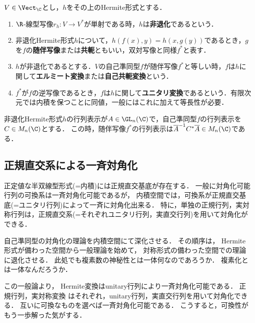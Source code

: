 \documentclass[uplatex, dvipdfmx]{jsreport}
\begin{document}
\begin{definition}
    $V\in\Vect_\C$とし，$h$をその上のHermite形式とする．
    \begin{enumerate}
        \item $\R$-線型写像$r_h:V\to V^*$が単射である時，$h$は\textbf{非退化}であるという．
        \item 非退化Hermite形式$h$について，$h(f(x),y)=h(x,g(y))$であるとき，$g$を$f$の\textbf{随伴写像}または\textbf{共軛}ともいい，双対写像と同様$f^*$と表す．
        \item $h$が非退化であるとする．$V$の自己準同型$f$が随伴写像$f^*$と等しい時，$f$は$h$に関して\textbf{エルミート変換}または\textbf{自己共軛変換}という．
        \item $f^*$が$f$の逆写像であるとき，$f$は$h$に関して\textbf{ユニタリ変換}であるという．有限次元では内積を保つことに同値，一般にはこれに加えて等長性が必要．
    \end{enumerate}
\end{definition}
\begin{remarks}[随伴写像の行列表示]
    非退化Hermite形式$h$の行列表示が$A\in\GL_n(\C)$で，自己準同型$f$の行列表示を$C\in M_n(\C)$とする．
    この時，随伴写像$f^*$の行列表示は$\overline{A}^{-1}C^*\overline{A}\in M_n(\C)$である．
\end{remarks}

\subsection{正規直交系による一斉対角化}\label{subsec-可換性と対角化}

\begin{tcolorbox}[colframe=ForestGreen, colback=ForestGreen!10!white,breakable,colbacktitle=ForestGreen!40!white,coltitle=black,fonttitle=\bfseries\sffamily,
title=]
    正定値な半双線型形式(=内積)には正規直交基底が存在する．
    一般に対角化可能行列の可換系は一斉対角化可能であるが，
    内積空間では，可換系が正規直交基底(=ユニタリ行列)によって一斉に対角化出来る．
    特に，単独の正規行列，実対称行列は，正規直交系(=それぞれユニタリ行列，実直交行列)を用いて対角化ができる．
\end{tcolorbox}

\begin{tcolorbox}[colframe=ForestGreen, colback=ForestGreen!10!white, breakable]
    自己準同型の対角化の理論を内積空間にて深化させる．
    その順序は，
    Hermite形式が備わった空間から一般理論を始めて，
    対称形式の備わった空間での理論に退化させる．
    此処でも複素数の神秘性とは一体何なのであろうか．
    複素化とは一体なんだろうか．

    この一般論より，
    Hermite変換はunitary行列により一斉対角化可能である．
    正規行列，実対称変換
    はそれぞれ，unitary行列，実直交行列を用いて対角化できる．
    互いに可換なものを選べば一斉対角化可能である．
    こうすると，可換性がもう一歩解った気がする．
\end{tcolorbox}
\end{document}
